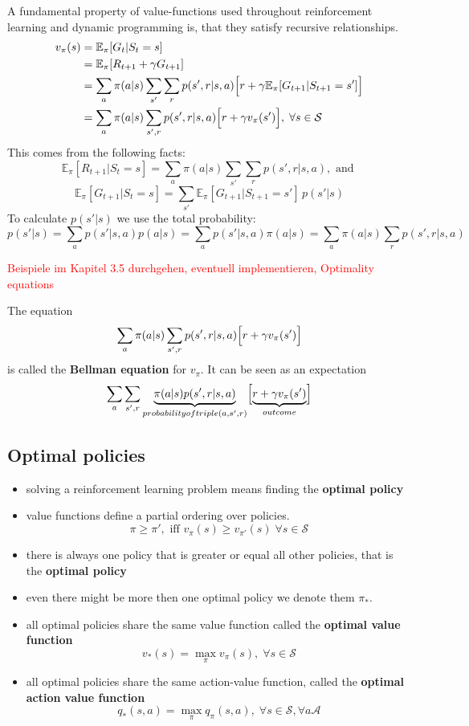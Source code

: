 \documentclass[10pt,a4paper]{article}
\begin{document}
A fundamental property of value-functions used throughout reinforcement learning and dynamic programming is, that they satisfy recursive relationships.
\[  \]
\begin{align*}
v_\pi(s) &= \mathbb{E}_\pi[G_t | S_t=s] \\
&= \mathbb{E}_\pi[ R_{t+1} + \gamma G_{t+1}] \\
&= \sum_a \pi(a|s) \sum_{s'} \sum_r p(s',r | s,a) \Bigl[r + \gamma \mathbb{E}_\pi[G_{t+1}|S_{t+1}=s'] \Bigr ]\\
&= \sum_a \pi(a|s) \sum_{s',r} p(s',r | s,a) \Bigl[r + \gamma v_\pi(s') \Bigr ], \; \forall s \in \mathcal{S}\\
\end{align*}
This comes from the following facts:
\[ \mathbb{E}_\pi[R_{t+1} | S_t=s ] = \sum_a \pi(a|s) \sum_{s'} \sum_r p(s',r | s,a), \text{ and } \]
\[ \mathbb{E}_\pi[G_{t+1} | S_t=s] = \sum_{s'} \mathbb{E}_\pi[G_{t+1} | S_{t+1} = s'] \, p(s'|s) \]
To calculate $p(s'|s)$ we use the total probability:
\[ p(s'|s) = \sum_a p(s' | s,a)p(a|s) = \sum_a p(s'|s,a)\pi(a|s) = \sum_a \pi(a|s) \sum_r p(s',r|s,a)\]

\textcolor{red}{Beispiele im Kapitel 3.5 durchgehen, eventuell implementieren, Optimality equations}

The equation
\[ \sum_a \pi(a|s) \sum_{s',r} p(s',r | s,a) \Bigl[r + \gamma v_\pi(s') \Bigr ]\]
is called the \textbf{Bellman equation} for $v_\pi$. It can be seen as an expectation
\[\sum_a \sum_{s',r} \underbrace{\pi(a|s)p(s',r | s,a)}_{probability of triple(a,s',r)} 
\Bigl[\underbrace{r + \gamma v_\pi(s')}_{outcome} \Bigr ] \]

\subsection{Optimal policies}
\begin{itemize}
\item solving a reinforcement learning problem means finding the \textbf{optimal policy}
\item value functions define a partial ordering over policies. 
\[ \pi \ge \pi', \text{ iff } v_\pi(s) \ge v_{\pi'}(s)\; \forall s \in \mathcal{S}\]
\item there is always one policy that is greater or equal all other policies, that is the \textbf{optimal policy}
\item even there might be more then one optimal policy we denote them $\pi_*$.
\item all optimal policies share the same value function called the \textbf{optimal value function}
\[ v_*(s) = \max_\pi v_\pi(s), \; \forall s \in \mathcal{S}\]
\item all optimal policies share the same action-value function, called the \textbf{optimal action value function}
\[ q_*(s,a) = \max_\pi q_\pi(s,a), \; \forall s \in \mathcal{S}, \forall a  \mathcal{A}\]
\end{itemize}
\end{document}
